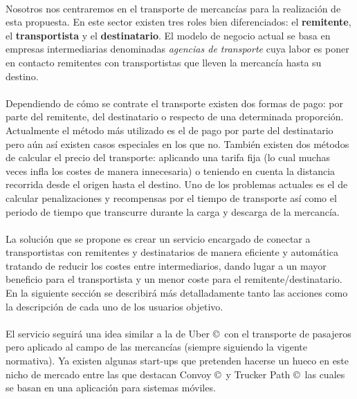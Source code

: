 \documentclass[10pt, a4paper,spanish]{article}
\begin{document}
			\paragraph{}
			Nosotros nos centraremos en el transporte de mercancías para la realización de esta propuesta. En este sector existen tres roles bien diferenciados: el \textbf{remitente}, el \textbf{transportista} y el \textbf{destinatario}. El modelo de negocio actual se basa en empresas intermediarias denominadas \textit{agencias de transporte} cuya labor es poner en contacto remitentes con transportistas que lleven la mercancía hasta su destino. 
			
			\paragraph{}
			Dependiendo de cómo se contrate el transporte existen dos formas de pago: por parte del remitente, del destinatario o respecto de una determinada proporción. Actualmente el método más utilizado es el de pago por parte del destinatario pero aún así existen casos especiales en los que no. También existen dos métodos de calcular el precio del transporte: aplicando una tarifa fija (lo cual muchas veces infla los costes de manera innecesaria) o teniendo en cuenta la distancia recorrida desde el origen hasta el destino. Uno de los problemas actuales es el de calcular penalizaciones y recompensas por el tiempo de transporte así como el periodo de tiempo que transcurre durante la carga y descarga de la mercancía.
			
			\paragraph{}
			La solución que se propone es crear un servicio encargado de conectar a transportistas con remitentes y destinatarios de manera eficiente y automática tratando de reducir los costes entre intermediarios, dando lugar a un mayor beneficio para el transportista y un menor coste para el remitente/destinatario. En la siguiente sección se describirá más detalladamente tanto las acciones como la descripción de cada uno de los usuarios objetivo.
			
			\paragraph{}
			El servicio seguirá una idea similar a la de Uber \copyright\  con el transporte de pasajeros pero aplicado al campo de las mercancías (siempre siguiendo la vigente normativa). Ya existen algunas start-ups que pretenden hacerse un hueco en este nicho de mercado entre las que destacan Convoy \copyright\ y Trucker Path \copyright\ las cuales se basan en una aplicación para sistemas móviles. \cite{expansion_uber_transporte}
			
\end{document}
